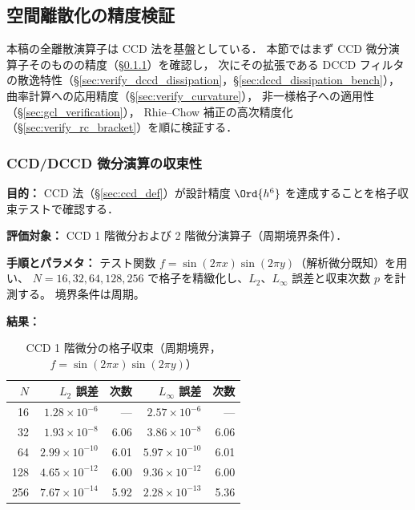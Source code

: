 %
\subsection{空間離散化の精度検証}
\label{sec:verify_spatial}

本稿の全離散演算子は CCD 法を基盤としている．
本節ではまず CCD 微分演算子そのものの精度（§\ref{sec:verify_ccd_convergence}）を確認し，
次にその拡張である DCCD フィルタの散逸特性（§\ref{sec:verify_dccd_dissipation}，§\ref{sec:dccd_dissipation_bench}），
曲率計算への応用精度（§\ref{sec:verify_curvature}），
非一様格子への適用性（§\ref{sec:gcl_verification}），
Rhie--Chow 補正の高次精度化（§\ref{sec:verify_rc_bracket}）を順に検証する．

\subsubsection{CCD/DCCD 微分演算の収束性}
\label{sec:verify_ccd_convergence}

\noindent\textbf{目的：}
CCD 法（§\ref{sec:ccd_def}）が設計精度 $\Ord{h^6}$ を達成することを格子収束テストで確認する．

\noindent\textbf{評価対象：}
CCD 1 階微分および 2 階微分演算子（周期境界条件）．

\noindent\textbf{手順とパラメタ：}
テスト関数 $f = \sin(2\pi x)\sin(2\pi y)$（解析微分既知）を用い、
$N = 16, 32, 64, 128, 256$ で格子を精緻化し、$L_2$、$L_\infty$ 誤差と収束次数 $p$ を計測する。
境界条件は周期。

\noindent\textbf{結果：}

\begin{table}[htbp]
\centering
\caption{CCD 1 階微分の格子収束（周期境界，$f = \sin(2\pi x)\sin(2\pi y)$）}
\label{tab:ccd_periodic}
\renewcommand{\arraystretch}{1.3}
\begin{tabular}{rrrrr}
\toprule
$N$ & $L_2$ 誤差 & 次数 & $L_\infty$ 誤差 & 次数 \\
\midrule
 16 & $1.28 \times 10^{-6}$  & ---  & $2.57 \times 10^{-6}$  & ---  \\
 32 & $1.93 \times 10^{-8}$  & 6.06 & $3.86 \times 10^{-8}$  & 6.06 \\
 64 & $2.99 \times 10^{-10}$ & 6.01 & $5.97 \times 10^{-10}$ & 6.01 \\
128 & $4.65 \times 10^{-12}$ & 6.00 & $9.36 \times 10^{-12}$ & 6.00 \\
256 & $7.67 \times 10^{-14}$ & 5.92 & $2.28 \times 10^{-13}$ & 5.36 \\
\bottomrule
\end{tabular}
\end{table}

